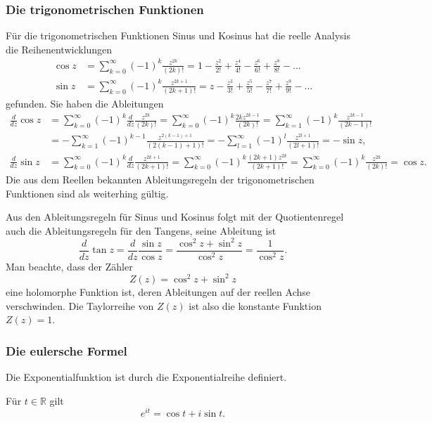 \subsubsection{Die trigonometrischen Funktionen}
Für die trigonometrischen Funktionen Sinus und Kosinus hat die
%
reelle Analysis die Reihenentwicklungen
\begin{align*}
\cos z
&=
\sum_{k=0}^\infty (-1)^k \frac{z^{2k}}{(2k)!}
=
1 - \frac{z^2}{2!} + \frac{z^4}{4!} - \frac{z^6}{6!} + \frac{z^8}{8!} - \dots
\\
\sin z
&=
\sum_{k=0}^\infty (-1)^k \frac{z^{2k+1}}{(2k+1)!}
=
z - \frac{z^3}{3!} + \frac{z^5}{5!} - \frac{z^7}{7!} + \frac{z^9}{9!} - \dots
\end{align*}
%
%
gefunden.
Sie haben die Ableitungen
\begin{align*}
\frac{d}{dz} \cos z
&=
\sum_{k=0}^{\infty} (-1)^k \frac{d}{dz} \frac{z^{2k}}{(2k)!}
=
\sum_{k=0}^{\infty} (-1)^k \frac{2kz^{2k-1}}{(2k)!}
=
\sum_{k=1}^{\infty} (-1)^k \frac{z^{2k-1}}{(2k-1)!}
\\
&=
-
\sum_{k=1}^{\infty} (-1)^{k-1} \frac{z^{2(k-1)+1}}{(2(k-1)+1)!}
=
-
\sum_{l=1}^{\infty} (-1)^l \frac{z^{2l+1}}{(2l+1)!}
=
-\sin z,
\\
\frac{d}{dz} \sin z
&=
\sum_{k=0}^\infty (-1)^k \frac{d}{dz} \frac{z^{2k+1}}{(2k+1)!}
=
\sum_{k=0}^\infty (-1)^k \frac{(2k+1)z^{2k}}{(2k+1)!}
=
\sum_{k=0}^\infty (-1)^k \frac{z^{2k}}{(2k)!}
=
\cos z.
\end{align*}
Die aus dem Reellen bekannten Ableitungsregeln der trigonometrischen
Funktionen sind als weiterhing gültig.

Aus den Ableitungsregeln für Sinus und Kosinus folgt mit der Quotientenregel
auch die Ableitungsregeln für den Tangens, seine Ableitung ist
\[
\frac{d}{dz}\tan z
=
\frac{d}{dz}
\frac{\sin z}{\cos z}
=
\frac{\cos^2z +\sin^2 z}{\cos^2z}
=
\frac{1}{\cos^2z}.
\]
%
Man beachte, dass der Zähler
\[
Z(z)
=
\cos^2z + \sin^2z
\]
eine holomorphe Funktion ist, deren Ableitungen auf der reellen Achse
verschwinden.
Die Taylorreihe von $Z(z)$ ist also die konstante Funktion $Z(z)=1$.

%
%
\subsubsection{Die eulersche Formel}
Die Exponentialfunktion ist durch die Exponentialreihe definiert.

\begin{satz}
%
\label{buch:holomorph:holomorph:satz:eulerformel}
Für $t\in\mathbb{R}$ gilt
\begin{equation}
e^{it}
=
\cos t + i \sin t.
\label{buch:holomorph:holomorph:eqn:eulerformel}
\end{equation}
\end{satz}

